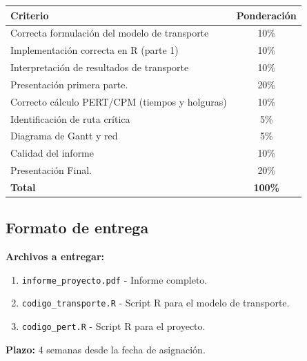 \documentclass[12pt,a4paper]{article}
\begin{document}
	\begin{table}[H]
		\centering
		\begin{tabular}{|l|c|}
			\hline
			\textbf{Criterio} & \textbf{Ponderación} \\
			\hline
			Correcta formulación del modelo de transporte & 10\% \\
			Implementación correcta en R (parte 1) & 10\% \\
			Interpretación de resultados de transporte & 10\% \\
			Presentación primera parte. & 20\% \\
			Correcto cálculo PERT/CPM (tiempos y holguras) & 10\% \\
			Identificación de ruta crítica & 5\% \\
			Diagrama de Gantt y red & 5\% \\
			Calidad del informe  & 10\% \\
			Presentación Final. & 20\% \\
			\hline
			\textbf{Total} & \textbf{100\%} \\
			\hline
		\end{tabular}
	\end{table}
	
	\subsection{Formato de entrega}
	
	\noindent \textbf{Archivos a entregar:}
	
	\begin{enumerate}
		\item \texttt{informe\_proyecto.pdf} - Informe completo.
		\item \texttt{codigo\_transporte.R} - Script R para el modelo de transporte.
		\item \texttt{codigo\_pert.R} - Script R para el proyecto.
	\end{enumerate}
	
	\noindent \textbf{Plazo:} 4 semanas desde la fecha de asignación.
	
	\newpage
	
\end{document}
